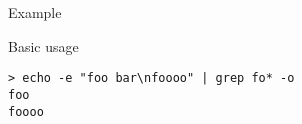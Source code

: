 \begin{frame}[fragile]{Example}
  \begin{exampleblock}{Basic usage}
    \begin{lstlisting}[showstringspaces=false]
> echo -e "foo bar\nfoooo" | grep fo* -o
foo
foooo
    \end{lstlisting}
  \end{exampleblock}
\end{frame}

